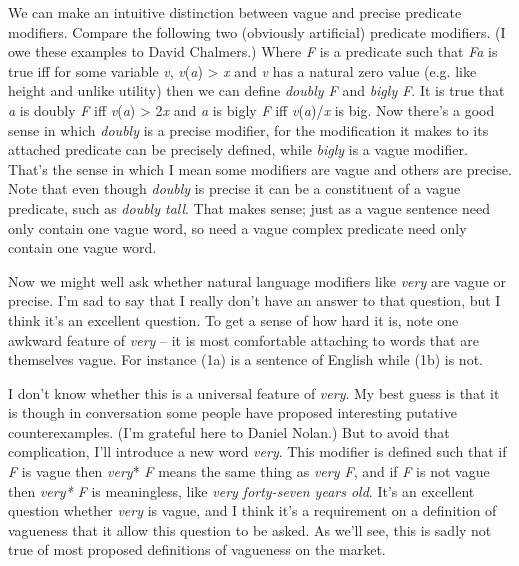 We can make an intuitive distinction between vague and precise predicate modifiers. Compare the following two (obviously artificial) predicate modifiers. (I owe these examples to David Chalmers.) Where \textit{F} is a predicate such that \textit{Fa} is true iff for some variable \textit{v}, \textit{v}(\textit{a}) {\textgreater} \textit{x} and \textit{v} has a natural zero value (e.g. like height and unlike utility) then we can define \textit{doubly F} and \textit{bigly F}. It is true that \textit{a} is doubly \textit{F} iff \textit{v}(\textit{a}) {\textgreater} 2\textit{x} and \textit{a} is bigly \textit{F} iff\textit{ v}(\textit{a})/\textit{x} is big. Now there's a good sense in which \textit{doubly} is a precise modifier, for the modification it makes to its attached predicate can be precisely defined, while \textit{bigly} is a vague modifier. That's the sense in which I mean some modifiers are vague and others are precise. Note that even though \textit{doubly} is precise it can be a constituent of a vague predicate, such as \textit{doubly tall}. That makes sense; just as a vague sentence need only contain one vague word, so need a vague complex predicate need only contain one vague word.

Now we might well ask whether natural language modifiers like \textit{very} are vague or precise. I'm sad to say that I really don't have an answer to that question, but I think it's an excellent question. To get a sense of how hard it is, note one awkward feature of \textit{very} -- it is most comfortable attaching to words that are themselves vague. For instance (1a) is a sentence of English while (1b) is not.


\noindent I don't know whether this is a universal feature of \textit{very}. My best guess is that it is though in conversation some people have proposed interesting putative counterexamples. (I'm grateful here to Daniel Nolan.) But to avoid that complication, I'll introduce a new word \textit{very}. This modifier is defined such that if \textit{F} is vague then \textit{very}* \textit{F} means the same thing as \textit{very F}, and if \textit{F} is not vague then \textit{very* F} is meaningless, like \textit{very forty-seven years old}. It's an excellent question whether \textit{very} is vague, and I think it's a requirement on a definition of vagueness that it allow this question to be asked. As we'll see, this is sadly not true of most proposed definitions of vagueness on the market.

